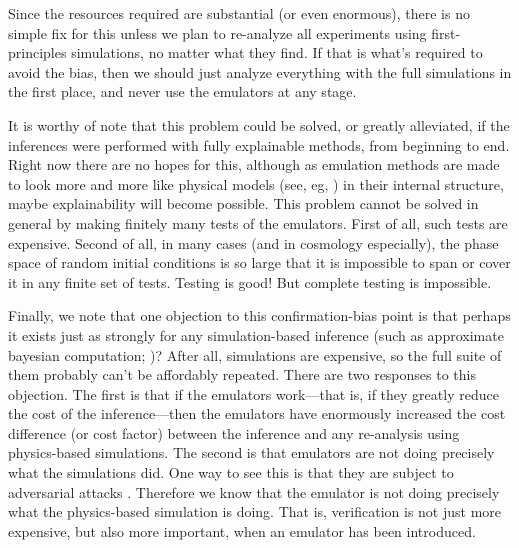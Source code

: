 \documentclass{article}
\begin{document}
Since the resources required are substantial (or even enormous), there is no simple fix for this unless we plan to re-analyze all experiments using first-principles simulations, no matter what they find.
If that is what's required to avoid the bias, then we should just analyze everything with the full simulations in the first place, and never use the emulators at any stage.

It is worthy of note that this problem could be solved, or greatly alleviated, if the inferences were performed with fully explainable methods, from beginning to end.
Right now there are no hopes for this, although as emulation methods are made to look more and more like physical models (see, eg, \citealt{scalars, villar2023dimensionless}) in their internal structure, maybe explainability will become possible.
This problem cannot be solved in general by making finitely many tests of the emulators.
First of all, such tests are expensive.
Second of all, in many cases (and in cosmology especially), the phase space of random initial conditions is so large that it is impossible to span or cover it in any finite set of tests.
Testing is good! But complete testing is impossible.

Finally, we note that one objection to this confirmation-bias point is that perhaps it exists just as strongly for any simulation-based inference (such as approximate bayesian computation; \citealt{abc})?
After all, simulations are expensive, so the full suite of them probably can't be affordably repeated.
There are two responses to this objection.
The first is that if the emulators work---that is, if they greatly reduce the cost of the inference---then the emulators have enormously increased the cost difference (or cost factor) between the inference and any re-analysis using physics-based simulations.
The second is that emulators are not doing precisely what the simulations did.
One way to see this is that they are subject to adversarial attacks \cite{melchior}.
Therefore we know that the emulator is not doing precisely what the physics-based simulation is doing.
That is, verification is not just more expensive, but also more important, when an emulator has been introduced.
\end{document}
